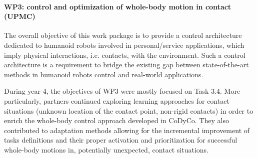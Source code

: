 \paragraph{WP3: control and optimization of whole-body motion in contact (UPMC)}

The overall objective of this work package is to provide a control architecture dedicated to humanoid robots involved in personal/service applications, which imply physical interactions, i.e. contacts, with the environment. Such a control architecture is a requirement to bridge the existing gap between state-of-the-art methods in humanoid robots control and real-world applications.

During year 4, the objectives of WP3 were mostly focused on Task 3.4. More particularly, partners continued exploring learning approaches for contact situations (unknown location of the contact point, non-rigid contacts) in order to enrich the whole-body control approach developed in CoDyCo. They also contributed to adaptation methods allowing for the incremental improvement of tasks definitions and their proper activation and prioritization for successful whole-body motions in, potentially unexpected, contact situations.